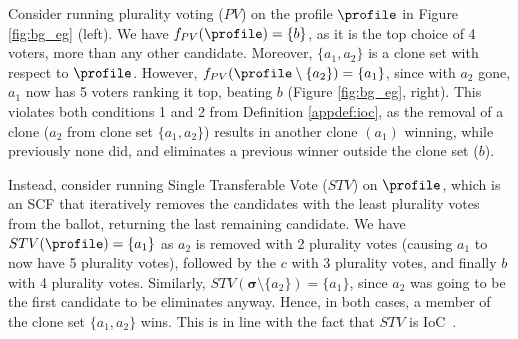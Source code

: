 \begin{example}
    Consider running plurality voting ($PV$) on the profile $\profile$ in Figure \ref{fig:bg_eg} (left). We have $f_{PV}(\profile)=\{b\}$, as it is the top choice of 4 voters, more than any other candidate. Moreover, $\{a_1,a_2\}$ is a clone set with respect to $\profile$. However, $f_{PV}(\profile \setminus \{a_2\}) = \{a_1\}$, since with $a_2$ gone, $a_1$ now has 5 voters ranking it top, beating $b$ (Figure \ref{fig:bg_eg}, right). This violates both conditions 1 and 2 from Definition \ref{appdef:ioc}, as the removal of a clone ($a_2$ from clone set $\{a_1,a_2\}$) results in another clone $(a_1)$ winning, while previously none did, and eliminates a previous winner outside the clone set ($b$).

    Instead, consider running Single Transferable Vote ($STV$) on $\profile$, which is an SCF that iteratively removes the candidates with the least plurality votes from the ballot, returning the last remaining candidate. We have $STV(\profile)=\{a_1\}$ as $a_2$ is removed with 2 plurality votes (causing $a_1$ to now have 5 plurality votes), followed by the $c$ with 3 plurality votes, and finally $b$ with 4 plurality votes. Similarly, $STV(\boldsymbol{\sigma} \setminus\{a_2\})=\{a_1\}$, since $a_2$ was going to be the first candidate to be eliminates anyway. Hence, in both cases, a member of the clone set $\{a_1,a_2\}$ wins. This is in line with the fact that $STV$ is IoC~\citep{Tideman87:Independence}. 
\end{example}

